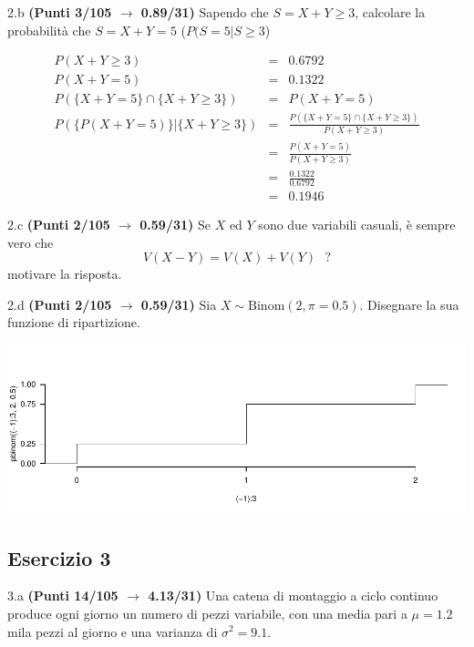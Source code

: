 \documentclass[
  11pt,
]{book}
\theoremstyle{mytheoremstyle}
\theoremstyle{mydefstyle}
\newenvironment{sol}
  {
  \begin{tcolorbox}[enhanced,breakable,arc=0.1mm,boxrule=1pt,colback=white,colframe=iblue,
  title=\bf \fontfamily{lmss}\selectfont \hspace{.5 cm} Soluzione,drop fuzzy shadow]

}{
\end{tcolorbox}
  }
\begin{document}
2.b \textbf{(Punti 3/105 \(\rightarrow\) 0.89/31)} Sapendo che \(S=X+Y\ge 3\), calcolare la probabilità che \(S=X+Y= 5\) (\(P(S=5|S\ge 3\))

\begin{sol}
\begin{eqnarray*}
  P(X+Y\ge 3) &=& 0.6792\\
  P(X+Y=5)    &=& 0.1322\\
  P(\{X+Y=5\}\cap\{X+Y\ge 3\}) &=&P(X+Y=5)\\
  P(\{P(X+Y=5)\}|\{X+Y\ge 3\}) &=&\frac{P(\{X+Y=5\}\cap\{X+Y\ge 3\})}{P(X+Y\ge 3)}\\
  &=&\frac{P(X+Y=5)}{P(X+Y\ge 3)}\\
  &=&\frac{0.1322}{0.6792}\\
  &=&0.1946
\end{eqnarray*}

\end{sol}

2.c \textbf{(Punti 2/105 \(\rightarrow\) 0.59/31)} Se \(X\) ed \(Y\) sono due variabili casuali, è sempre vero che
\[
V(X-Y)=V(X)+V(Y)~~~?
\]
motivare la risposta.

2.d \textbf{(Punti 2/105 \(\rightarrow\) 0.59/31)} Sia \(X\sim\text{Binom}(2,\pi=0.5)\). Disegnare la sua funzione di ripartizione.

\begin{sol}

\begin{center}\includegraphics{Esami_passati_con_soluzioni_files/figure-latex/2023-187-1} \end{center}

\end{sol}

\subsection{Esercizio 3}\label{esercizio-3-28}

3.a \textbf{(Punti 14/105 \(\rightarrow\) 4.13/31)} Una catena di montaggio a ciclo continuo produce ogni giorno un numero di pezzi variabile, con una media pari a
\(\mu=1.2\) mila pezzi al giorno e una varianza di \(\sigma^2=9.1\).
\end{document}
